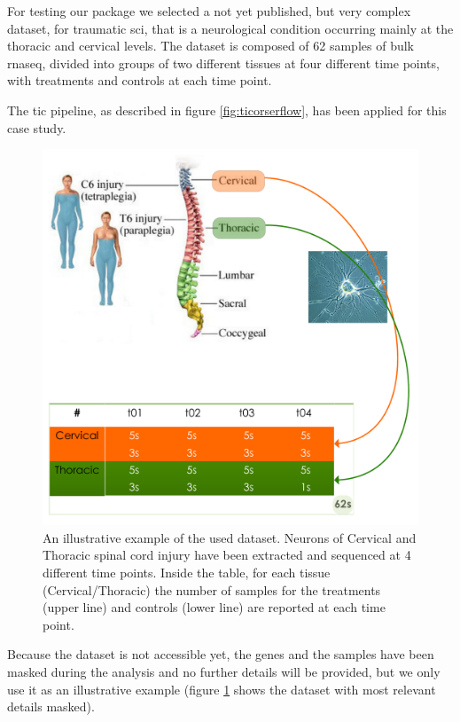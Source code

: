 For testing our package we selected a not yet published, but very complex dataset, for traumatic \gls{sci}, that is a neurological condition occurring mainly at the thoracic and cervical levels.
The dataset is composed of 62 samples of bulk \gls{rnaseq}, divided into groups of two different tissues at four different time points, with treatments and controls at each time point.

The \gls{tic} pipeline, as described in figure \ref{fig:ticorserflow}, has been applied for this case study.

\begin{figure}[H]
\centering
\includegraphics[width=\textwidth, keepaspectratio]{img/ticorser/dataset.pdf}
\caption[ticorser dataset]{An illustrative example of the used dataset. Neurons of Cervical and Thoracic spinal cord injury have been extracted and sequenced at 4 different time points. Inside the table, for each tissue (Cervical/Thoracic) the number of samples for the treatments (upper line) and controls (lower line) are reported at each time point.}
\label{fig:ticorserdataset}

\end{figure}

Because the dataset is not accessible yet, the genes and the samples have been masked during the analysis and no further details will be provided, but we only use it as an illustrative example (figure \ref{fig:ticorserdataset} shows the dataset with most relevant details masked).

